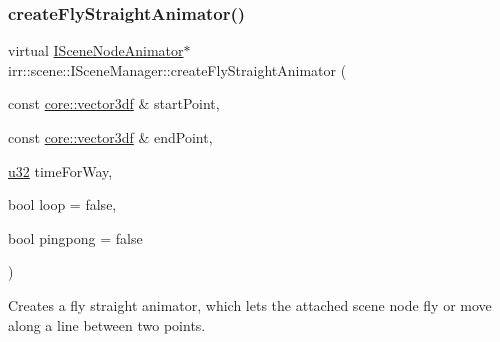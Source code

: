 \subsubsection{\texorpdfstring{create\+Fly\+Straight\+Animator()}{createFlyStraightAnimator()}\hspace{0.1cm}{\footnotesize\ttfamily [1/2]}}
{\footnotesize\ttfamily virtual \hyperlink{classirr_1_1scene_1_1ISceneNodeAnimator}{I\+Scene\+Node\+Animator}$\ast$ irr\+::scene\+::\+I\+Scene\+Manager\+::create\+Fly\+Straight\+Animator (\begin{DoxyParamCaption}\item[{const \hyperlink{namespaceirr_1_1core_ae6e2b2a6c552833ebbd5b7463d03586b}{core\+::vector3df} \&}]{start\+Point,  }\item[{const \hyperlink{namespaceirr_1_1core_ae6e2b2a6c552833ebbd5b7463d03586b}{core\+::vector3df} \&}]{end\+Point,  }\item[{\hyperlink{namespaceirr_a0416a53257075833e7002efd0a18e804}{u32}}]{time\+For\+Way,  }\item[{bool}]{loop = {\ttfamily false},  }\item[{bool}]{pingpong = {\ttfamily false} }\end{DoxyParamCaption})\hspace{0.3cm}{\ttfamily [pure virtual]}}



Creates a fly straight animator, which lets the attached scene node fly or move along a line between two points. 


